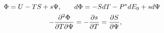 \documentclass[english,12pt]{ttuthes}
\newcommand{\Fc}{\mathcal{F}}
\begin{document}
\begin{align}\label{eq:Grand_Potential_Maxwell's_Relations}  
  \Phi=U-TS+s\Psi, \qquad &d\Phi=-SdT-P^*dE_0+sd\Psi\\
  \quad -\frac{\partial^2\Phi}{\partial T\partial\Psi}&=-\frac{\partial s}{\partial T}
                                   =\frac{\partial S}{\partial\Psi},                              
                                   \notag
\end{align}  
%
\end{document}

